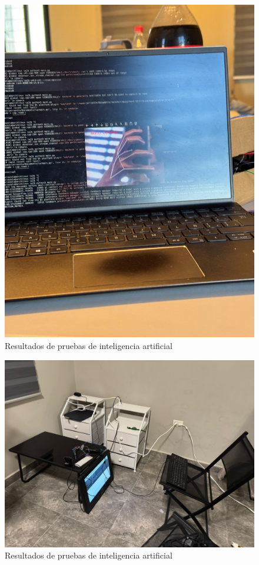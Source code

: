 \begin{figure}[H]
    \centering
    \includegraphics[width=1\textwidth]{img/PruebaIA8.png}
    \caption{Resultados de pruebas de inteligencia artificial}
    \label{fig:ai-test}
\end{figure}

\begin{figure}[H]
    \centering
    \includegraphics[width=1\textwidth]{img/PruebaIA9.png}
    \caption{Resultados de pruebas de inteligencia artificial}
    \label{fig:ai-test}
\end{figure}


